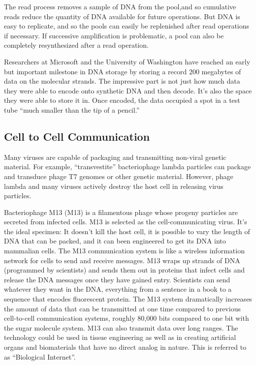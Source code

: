 The read process removes a sample of DNA from the pool,and so cumulative reads reduce the quantity of DNA available for future operations. But DNA is easy to replicate, and so the pools can easily be replenished after read operations if necessary. If successive amplification is problematic, a pool can also be completely resynthesized after a read operation.

Researchers at Microsoft and the University of Washington have reached an early but important milestone in DNA storage by storing a record 200 megabytes of data on the molecular strands. The impressive part is not just how much data they were able to encode onto synthetic DNA and then decode. It’s also the space they were able to store it in. Once encoded, the data occupied a spot in a test tube “much smaller than the tip of a pencil.”
\subsection{Cell to Cell Communication}

Many viruses are capable of packaging and transmitting non-viral genetic material. For example, “transvestite” bacteriophage lambda particles can package and transduce phage T7 genomes or other genetic material. However, phage lambda and many viruses actively destroy the host cell in releasing virus particles.

Bacteriophage M13 (M13) is a filamentous phage whose progeny particles are secreted from infected cells.
M13 is selected as the cell-communicating virus. It’s the ideal specimen: It doesn’t kill the host cell, it is possible to vary the length of DNA that can be packed, and it can been engineered to get its DNA into mammalian cells. The M13 communication system is like a wireless information network for cells to send and receive messages. M13 wraps up strands of DNA (programmed by scientists) and sends them out in proteins that infect cells and release the DNA messages once they have gained entry. Scientists can send whatever they want in the DNA, everything from a sentence in a book to a sequence that encodes fluorescent protein. The M13 system dramatically increases the amount of data that can be transmitted at one time compared to previous cell-to-cell communication systems, roughly 80,000 bits compared to one bit with the sugar molecule system. M13 can also transmit data over long ranges. The technology could be used in tissue engineering as well as in creating artificial organs and biomaterials that have no direct analog in nature. This is referred to as ``Biological Internet''.

